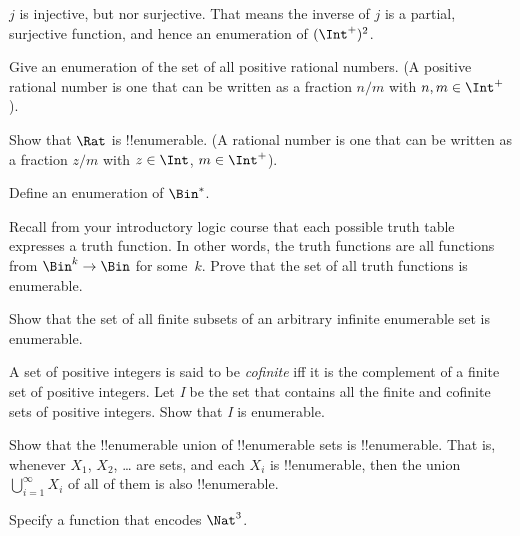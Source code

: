 \documentclass[../../../include/open-logic-section]{subfiles}
\begin{document}
\begin{explain}
$j$ is injective, but nor surjective.  That means the inverse of $j$ is a partial, surjective function, and hence an enumeration of $(\Int^+)^2$.
\end{explain}

\begin{prob}
Give an enumeration of the set of all positive rational numbers. (A
positive rational number is one that can be written as a fraction
$n/m$ with $n, m \in \Int^+$).
\end{prob}

\begin{prob}
Show that $\Rat$ is !!{enumerable}. (A rational number is one that can
be written as a fraction $z/m$ with $z \in \Int$, $m \in \Int^+$).
\end{prob}

\begin{prob}
Define an enumeration of $\Bin^*$.
\end{prob}

\begin{prob}
Recall from your introductory logic course that each possible truth
table expresses a truth function. In other words, the truth functions
are all functions from $\Bin^k \to \Bin$ for some~$k$. Prove that the
set of all truth functions is enumerable.
\end{prob}

\begin{prob}
Show that the set of all finite subsets of an arbitrary infinite
enumerable set is enumerable.
\end{prob}

\begin{prob}
A set of positive integers is said to be \emph{cofinite} iff
it is the complement of a finite set of positive integers. Let
\emph{I} be the set that contains all the finite and cofinite sets of
positive integers. Show that \emph{I} is enumerable.
\end{prob}

\begin{prob}
Show that the !!{enumerable} union of !!{enumerable} sets is
!!{enumerable}. That is, whenever $X_1$, $X_2$, \dots{} are sets, and
each $X_i$ is !!{enumerable}, then the union $\bigcup_{i=1}^\infty
X_i$ of all of them is also !!{enumerable}.
\end{prob}

\begin{prob}
Specify a function that encodes $\Nat^3$.
\end{prob}
\end{document}
